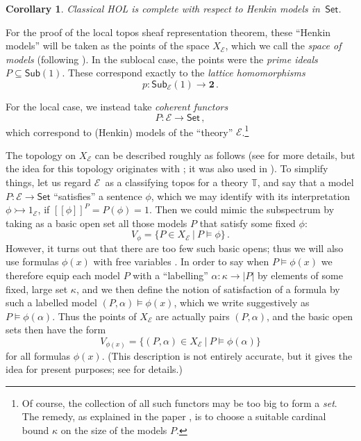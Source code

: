 \documentclass[12pt]{article}
\newcommand{\T}{\ensuremath{\mathbb{T}}}
\newcommand{\E}{\ensuremath{\mathcal{E}}}
\newcommand{\Set}{\ensuremath{\mathsf{Set}}}
\newcommand{\mono}{\ensuremath{\rightarrowtail}}
\newtheorem*{corollary*}{Corollary}
\theoremstyle{remark}
\theoremstyle{definition}
\begin{document}
\begin{corollary*}
Classical HOL is complete with respect to Henkin models in~$\Set$.
\end{corollary*}

For the proof of the local topos sheaf representation theorem, these ``Henkin models'' will be taken as the points of the space $X_\E$, which we call the \emph{space of models} (following \cite{BM}).
In the  sublocal case, the points were the \emph{prime ideals} $P\subseteq\mathsf{Sub}(1)$.
These correspond exactly to the \emph{lattice homomorphisms} $$p: \mathsf{Sub}_{\E}(1)\to \mathbf{2}\,.$$

For the local case, we instead take \emph{coherent functors} $$P: \E\to\Set\,,$$
which correspond to (Henkin) models of the ``theory'' $\E$.\footnote{
Of course, the collection of all such functors may be too big to form a \emph{set}.  The remedy, as explained in the paper \cite{A}, is to choose a suitable cardinal bound $\kappa$ on the size of the models $P$.}

The topology on $X_\E$ can be described roughly as follows (see \cite{A} for more details, but the idea for this topology originates with \cite{JM,BM}; it was also used in \cite{AF,B}).  To simplify things, let us regard \E\ as a classifying topos for a theory $\T$, and say that a model $P: \E\to \Set$ ``satisfies'' a sentence $\phi$, which we may identify with its interpretation $\phi \mono 1_\E$, if $[\![\phi]\!]^P = P(\phi) = 1$. Then we could mimic the subspectrum by taking as a basic open set all those models $P$ that satisfy some fixed $\phi$:  
\[
V_\phi = \{ P\in X_\E\ |\ P\models \phi \}\,.
\]
However, it turns out that there are too few such basic opens; thus we will also use formulas $\phi(x)$ with free variables .  In order to say when $P\models \phi(x)$ we therefore equip each model $P$ with a ``labelling'' $\alpha : \kappa \rightarrow |P|$ by elements of some fixed, large set $\kappa$, and we then define the notion of satisfaction of a formula by such a labelled model $(P, \alpha) \models \phi(x)$, which we write suggestively as $P \models \phi(\alpha)$.  Thus the points of $X_\E$ are actually pairs $(P, \alpha)$, and the basic open sets then have the form 
\[
V_{\phi(x)} = \{ (P,\alpha)\in X_\E\ |\ P\models \phi(\alpha) \}
\]
for all formulas $\phi(x)$. (This description is not entirely accurate, but it gives the idea for present purposes; see \cite{A,AF,B} for details.)
\end{document}
